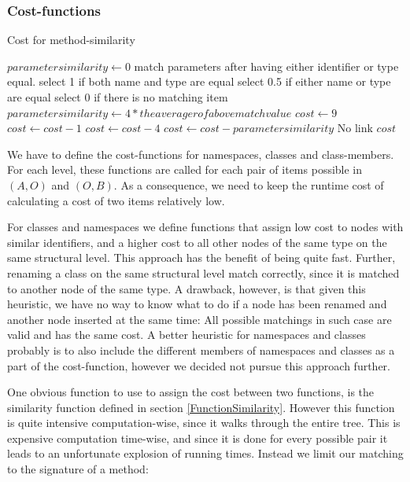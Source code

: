 \documentclass[11pt]{article}
\begin{document}
\subsubsection{Cost-functions}

\begin{algorithm}
\caption{Cost for method-similarity}
\label{MethodCostFunction}
\begin{algorithmic}
   \State $parametersimilarity \gets 0$
      \State match parameters after having either identifier or type equal.
	      \State select 1 if both name and type are equal
    	  \State select 0.5 if either name or type are equal
	      \State select 0 if there is no matching item
      \EndFor
      \State $parametersimilarity \gets 4*the averager of above match value$
   \EndIf
   \State $cost \gets 9$
      \State $cost \gets cost - 1$
   \EndIf
      \State $cost \gets cost - 4$
   \EndIf
   \State $cost \gets cost - parametersimilarity$
         \State \Return No link
   \EndIf
   \State \Return $cost$
\EndFunction
\end{algorithmic}
\end{algorithm}


We have to define the cost-functions for namespaces, classes and class-members. For each level, these functions are called for each pair of items possible in $(A, O)$ and $(O, B)$. As a consequence, we need to keep the runtime cost of calculating a cost of two items relatively low.

For classes and namespaces we define functions that assign low cost to nodes with similar identifiers, and a higher cost to all other nodes of the same type on the same structural level. This approach has the benefit of being quite fast. Further, renaming a class on the same structural level match correctly, since it is matched to another node of the same type. A drawback, however, is that given this heuristic, we have no way to know what to do if a node has been renamed and another node inserted at the same time: All possible matchings in such case are valid and has the same cost. A better heuristic for namespaces and classes probably is to also include the different members of namespaces and classes as a part of the cost-function, however we decided not pursue this approach further.

One obvious function to use to assign the cost between two functions, is the similarity function defined in section \ref{FunctionSimilarity}. However this function is quite intensive computation-wise, since it walks through the entire tree. This is expensive computation time-wise, and since it is done for every possible pair it leads to an unfortunate explosion of running times. Instead we limit our matching to the signature of a method:
\end{document}
